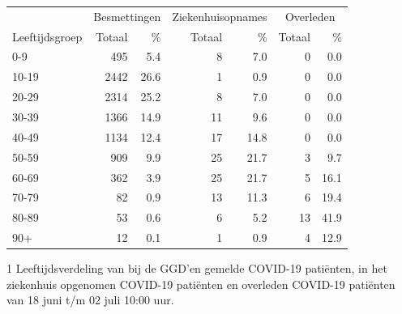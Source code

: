 \documentclass[
  english,
  man,floatsintext]{apa6}
\begin{document}
\begin{table}
\centering\begingroup\fontsize{11}{13}\selectfont

\begin{threeparttable}
\begin{tabular}{lrrrrrr}
\toprule
\multicolumn{1}{c}{ } & \multicolumn{2}{c}{Besmettingen} & \multicolumn{2}{c}{Ziekenhuisopnames} & \multicolumn{2}{c}{Overleden} \\
\cmidrule(l{3pt}r{3pt}){2-3} \cmidrule(l{3pt}r{3pt}){4-5} \cmidrule(l{3pt}r{3pt}){6-7}
Leeftijdsgroep & Totaal & \% & Totaal & \% & Totaal & \%\\
\midrule
0-9 & 495 & 5.4 & 8 & 7.0 & 0 & 0.0\\
10-19 & 2442 & 26.6 & 1 & 0.9 & 0 & 0.0\\
20-29 & 2314 & 25.2 & 8 & 7.0 & 0 & 0.0\\
30-39 & 1366 & 14.9 & 11 & 9.6 & 0 & 0.0\\
40-49 & 1134 & 12.4 & 17 & 14.8 & 0 & 0.0\\
50-59 & 909 & 9.9 & 25 & 21.7 & 3 & 9.7\\
60-69 & 362 & 3.9 & 25 & 21.7 & 5 & 16.1\\
70-79 & 82 & 0.9 & 13 & 11.3 & 6 & 19.4\\
80-89 & 53 & 0.6 & 6 & 5.2 & 13 & 41.9\\
90+ & 12 & 0.1 & 1 & 0.9 & 4 & 12.9\\
\bottomrule
\end{tabular}
\begin{tablenotes}
\item[1] Leeftijdsverdeling van bij de GGD’en gemelde COVID-19 patiënten, in het ziekenhuis opgenomen COVID-19 patiënten en overleden COVID-19 patiënten van 18 juni t/m 02 juli 10:00 uur.
\end{tablenotes}
\end{threeparttable}
\endgroup{}
\end{table}

\newpage
\end{document}
